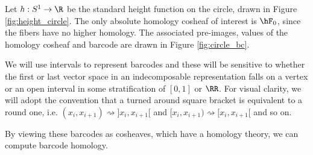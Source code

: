 \begin{ex}
Let $h:S^1\to\R$ be the standard height function on the circle, drawn in Figure \ref{fig:height_circle}. The only absolute homology cosheaf of interest is $\hF_0$, since the fibers have no higher homology. The associated pre-images, values of the homology cosheaf and barcode are drawn in Figure \ref{fig:circle_bc}.
\end{ex}

\begin{rmk}
We will use intervals to represent barcodes and these will be sensitive to whether the first or last vector space in an indecomposable representation falls on a vertex or an open interval in some stratification of $[0,1]$ or $\RR$. For visual clarity, we will adopt the convention that a turned around square bracket is equivalent to a round one, i.e. $(x_i,x_{i+1})\rightsquigarrow ]x_{i},x_{i+1}[$ and $[x_i,x_{i+1})\rightsquigarrow [x_i,x_{i+1}[$ and so on.
\end{rmk}

By viewing these barcodes as cosheaves, which have a homology theory, we can compute barcode homology.

